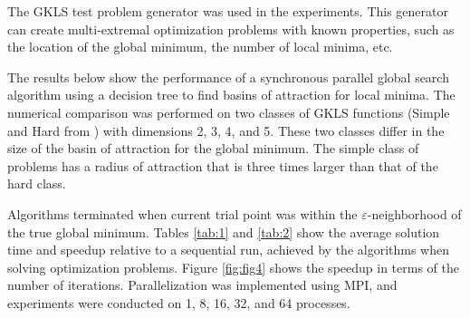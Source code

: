 \documentclass[runningheads]{llncs}
\begin{document}
The GKLS test problem generator was used in the experiments. This generator can create multi-extremal optimization problems with known properties, such as the location of the global minimum, the number of local minima, etc.


The results below show the performance of a synchronous parallel global search algorithm using a decision tree to find basins of attraction for local minima. The numerical comparison was performed on two classes of GKLS functions (Simple and Hard from \cite{Sergeyev2006}) with dimensions 2, 3, 4, and 5. These two classes differ in the size of the basin of attraction for the global minimum. The simple class of problems has a radius of attraction that is three times larger than that of the hard class.



Algorithms terminated when current trial point was within the $\varepsilon$-neighborhood of the true global minimum. Tables \ref{tab:1} and \ref{tab:2} show the average solution time and speedup relative to a sequential run, achieved by the algorithms when solving optimization problems. Figure \ref{fig:fig4} shows the speedup in terms of the number of iterations. Parallelization was implemented using MPI, and experiments were conducted on 1, 8, 16, 32, and 64 processes.
\end{document}
